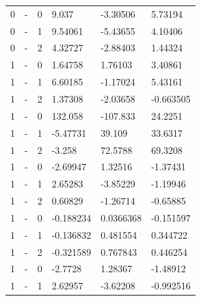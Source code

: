\begin{longtable}
{}0 & \allowbreak{}-\allowbreak{} & 0 & 9.037 & -3.30506 & 5.73194 \\
{}0 & \allowbreak{}-\allowbreak{} & 1 & 9.54061 & -5.43655 & 4.10406 \\
{}0 & \allowbreak{}-\allowbreak{} & 2 & 4.32727 & -2.88403 & 1.44324 \\
{}1 & \allowbreak{}-\allowbreak{} & 0 & 1.64758 & 1.76103 & 3.40861 \\
{}1 & \allowbreak{}-\allowbreak{} & 1 & 6.60185 & -1.17024 & 5.43161 \\
{}1 & \allowbreak{}-\allowbreak{} & 2 & 1.37308 & -2.03658 & -0.663505 \\
{}1 & \allowbreak{}-\allowbreak{} & 0 & 132.058 & -107.833 & 24.2251 \\
{}1 & \allowbreak{}-\allowbreak{} & 1 & -5.47731 & 39.109 & 33.6317 \\
{}1 & \allowbreak{}-\allowbreak{} & 2 & -3.258 & 72.5788 & 69.3208 \\
{}1 & \allowbreak{}-\allowbreak{} & 0 & -2.69947 & 1.32516 & -1.37431 \\
{}1 & \allowbreak{}-\allowbreak{} & 1 & 2.65283 & -3.85229 & -1.19946 \\
{}1 & \allowbreak{}-\allowbreak{} & 2 & 0.60829 & -1.26714 & -0.65885 \\
{}1 & \allowbreak{}-\allowbreak{} & 0 & -0.188234 & 0.0366368 & -0.151597 \\
{}1 & \allowbreak{}-\allowbreak{} & 1 & -0.136832 & 0.481554 & 0.344722 \\
{}1 & \allowbreak{}-\allowbreak{} & 2 & -0.321589 & 0.767843 & 0.446254 \\
{}1 & \allowbreak{}-\allowbreak{} & 0 & -2.7728 & 1.28367 & -1.48912 \\
{}1 & \allowbreak{}-\allowbreak{} & 1 & 2.62957 & -3.62208 & -0.992516 \\

\end{longtable}
